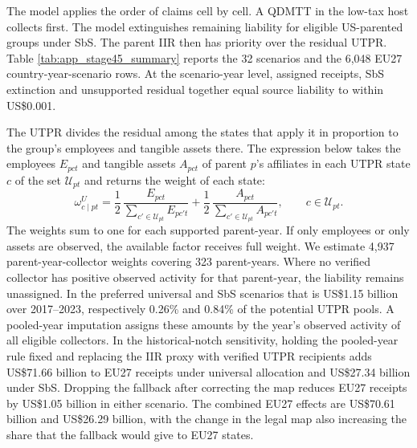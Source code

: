 \documentclass[11pt,a4paper]{article}
\newcommand{\usd}{US\$}
\begin{document}
The model applies the order of claims cell by cell. A QDMTT in the low-tax host collects first. The model extinguishes remaining liability for eligible US-parented groups under SbS. The parent IIR then has priority over the residual UTPR. Table \ref{tab:app_stage45_summary} reports the 32 scenarios and the 6,048 EU27 country-year-scenario rows. At the scenario-year level, assigned receipts, SbS extinction and unsupported residual together equal source liability to within \usd0.001.



The UTPR divides the residual among the states that apply it in proportion to the group's employees and tangible assets there. The expression below takes the employees $E_{pct}$ and tangible assets $A_{pct}$ of parent $p$'s affiliates in each UTPR state $c$ of the set $\mathcal U_{pt}$ and returns the weight of each state:
\begin{equation}\label{eq:app_utpr}
\omega^{U}_{c\mid pt}=\frac12\,\frac{E_{pct}}{\sum_{c'\in\mathcal U_{pt}}E_{pc't}}+\frac12\,\frac{A_{pct}}{\sum_{c'\in\mathcal U_{pt}}A_{pc't}},\qquad c\in\mathcal U_{pt}.
\end{equation}
The weights sum to one for each supported parent-year. If only employees or only assets are observed, the available factor receives full weight. We estimate 4,937 parent-year-collector weights covering 323 parent-years. Where no verified collector has positive observed activity for that parent-year, the liability remains unassigned. In the preferred universal and SbS scenarios that is \usd1.15 billion over 2017–2023, respectively 0.26\% and 0.84\% of the potential UTPR pools. A pooled-year imputation assigns these amounts by the year's observed activity of all eligible collectors. In the historical-notch sensitivity, holding the pooled-year rule fixed and replacing the IIR proxy with verified UTPR recipients adds \usd71.66 billion to EU27 receipts under universal allocation and \usd27.34 billion under SbS. Dropping the fallback after correcting the map reduces EU27 receipts by \usd1.05 billion in either scenario. The combined EU27 effects are \usd70.61 billion and \usd26.29 billion, with the change in the legal map also increasing the share that the fallback would give to EU27 states.
\end{document}
